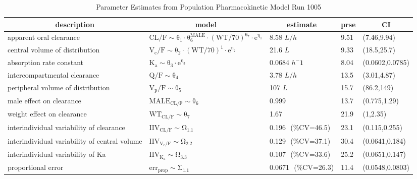\begin{table}[ht]
 \caption[Model 1005 Parameters]{Parameter Estimates from Population Pharmacokinetic Model Run 1005\label{p1005}} 
 \begin{center}
 \begin{tabular}{lllll}\hline\hline
\multicolumn{1}{c}{description}&\multicolumn{1}{c}{model}&\multicolumn{1}{c}{estimate}&\multicolumn{1}{c}{prse}&\multicolumn{1}{c}{CI}\tabularnewline
\hline
apparent oral clearance&$\mathrm{CL/F  \sim \theta_{1}\cdot  \theta_{6}^{MALE}\cdot (WT/70)^{\theta_{7}}\cdot e^{\eta_{1}}}$&8.58 $ L/h $&9.51&(7.46,9.94)\tabularnewline
central volume of distribution&$\mathrm{V_{c}/F  \sim \theta_{2}\cdot (WT/70)^{1}\cdot e^{\eta_{2}}}$&21.6 $ L $&9.33&(18.5,25.7)\tabularnewline
absorption rate constant&$\mathrm{K_{a} \sim \theta_{3}\cdot e^{\eta_{3}}}$&0.0684 $ h^-1  $&8.04&(0.0602,0.0785)\tabularnewline
intercompartmental clearance&$\mathrm{Q/F  \sim \theta_{4}}$&3.78 $ L/h $&13.5&(3.01,4.87)\tabularnewline
peripheral volume of distribution&$\mathrm{V_{p}/F  \sim \theta_{5}}$&107 $ L $&15.7&(86.2,149)\tabularnewline
male effect on clearance&$\mathrm{MALE_{CL/F}\sim \theta_{6}}$&0.999 $  $&13.7&(0.775,1.29)\tabularnewline
weight effect on clearance&$\mathrm{WT_{CL/F}\sim \theta_{7}}$&1.67 $  $&21.9&(1,2.35)\tabularnewline
interindividual variability of clearance&$\mathrm{IIV_{CL/F}\sim \Omega_{1.1}}$&0.196 $  $ (\%CV=46.5)&23.1&(0.115,0.255)\tabularnewline
interindividual variability of central volume&$\mathrm{IIV_{V_{c}/F}\sim \Omega_{2.2}}$&0.129 $  $ (\%CV=37.1)&30.4&(0.0641,0.184)\tabularnewline
interindividual variability of Ka&$\mathrm{IIV_{K_{a}}\sim \Omega_{3.3}}$&0.107 $  $ (\%CV=33.6)&25.2&(0.0651,0.147)\tabularnewline
proportional error&$\mathrm{err_{prop}\sim \Sigma_{1.1}}$&0.0671 $  $ (\%CV=26.3)&11.4&(0.0548,0.0803)\tabularnewline
\hline
\end{tabular}

\end{center}

\end{table}
